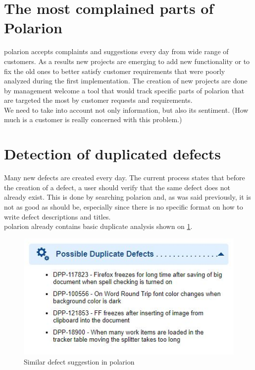 \documentclass[thesis=M,english]{FITthesis}[2012/06/26]
\begin{document}
\section{The most complained parts of Polarion}

\acrshort{polarion} accepts complaints and suggestions every day from wide range of customers. As a results new projects are emerging to add new functionality or to fix the old ones to better satisfy customer requirements that were poorly analyzed during the first implementation. The creation of new projects are done by management welcome a tool that would track specific parts of \acrshort{polarion} that are targeted the most by customer requests and requirements.\\

We need to take into account not only information, but also its sentiment. (How much is a customer is really concerned with this problem.) 	

\section{Detection of duplicated defects}

Many new defects are created every day. The current process states that before the creation of a defect, a user should verify that the same defect does not already exist. This is done by searching \acrshort{polarion} and, as was said previously, it is not as good as should be, especially since there is no specific format on how to write defect descriptions and titles. \\

\acrshort{polarion} already contains basic duplicate analysis shown on \ref{fig:polarion_defect_similar}.

\begin{figure}[h!]\centering
	\includegraphics[width=1\textwidth]{pictures/polarion_defect_similar}
	\caption{Similar defect suggestion in \acrshort{polarion}}\label{fig:polarion_defect_similar}
\end{figure}
\end{document}
